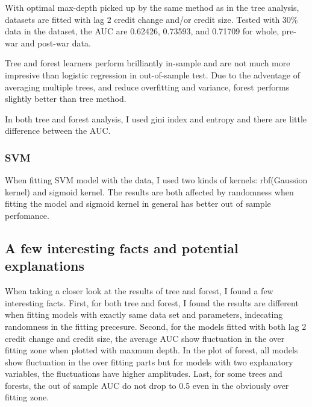 \documentclass{article}
\begin{document}
With optimal max-depth picked up by the same method as in the tree
analysis, datasets are fitted with lag 2 credit change and/or credit
size. Tested with 30\% data in the dataset, the AUC are 0.62426,
0.73593, and 0.71709 for whole, pre-war and post-war data.

Tree and forest learners perform brilliantly in-sample and
are not much more impresive than logistic regression in out-of-sample test. Due
to the adventage of averaging multiple trees, and reduce overfitting and
variance, forest
performs slightly better than tree method.

In both tree and forest analysis, I used gini index and entropy and
there are little difference between the AUC.

\subsubsection*{SVM}

When fitting SVM model with the data, I used two kinds of kernels:
rbf(Gaussion kernel) and sigmoid kernel. The results are both affected
by randomness when fitting the model and sigmoid kernel in general has
better out of sample perfomance. 


\subsection*{A few interesting facts and potential explanations}


When taking a closer look at the results of tree and forest, I found a
few interesting facts. First, for both tree and forest, I found the
results are different when fitting models with exactly same data set and
parameters, indecating randomness in the
fitting precesure. Second, for the
models fitted with both lag 2 credit change and credit size, the average
AUC show fluctuation in the over fitting zone when plotted with maxmum depth.
In the plot of forest,
all models show fluctuation in the over fitting parts but for models
with two explanatory variables, the fluctuations have higher amplitudes.
Last, for some trees and forests, the out
of sample AUC do not drop to 0.5 even in the obviously over fitting
zone.
\end{document}
